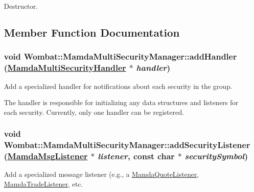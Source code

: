 Destructor. 



\subsection{Member Function Documentation}
\hypertarget{classWombat_1_1MamdaMultiSecurityManager_1a3afde9cf3c54cfc637a461346b3041}{
\subsubsection[addHandler]{\setlength{\rightskip}{0pt plus 5cm}void Wombat::Mamda\-Multi\-Security\-Manager::add\-Handler (\hyperlink{classWombat_1_1MamdaMultiSecurityHandler}{Mamda\-Multi\-Security\-Handler} $\ast$ {\em handler})}}
\label{classWombat_1_1MamdaMultiSecurityManager_1a3afde9cf3c54cfc637a461346b3041}


Add a specialized handler for notifications about each security in the group. 

The handler is responsible for initializing any data structures and listeners for each security. Currently, only one handler can be registered. \hypertarget{classWombat_1_1MamdaMultiSecurityManager_91699087725a9bfeadd57f3e958c3439}{
\subsubsection[addSecurityListener]{\setlength{\rightskip}{0pt plus 5cm}void Wombat::Mamda\-Multi\-Security\-Manager::add\-Security\-Listener (\hyperlink{classWombat_1_1MamdaMsgListener}{Mamda\-Msg\-Listener} $\ast$ {\em listener}, const char $\ast$ {\em security\-Symbol})}}
\label{classWombat_1_1MamdaMultiSecurityManager_91699087725a9bfeadd57f3e958c3439}


Add a specialized message listener (e.g., a \hyperlink{classWombat_1_1MamdaQuoteListener}{Mamda\-Quote\-Listener}, \hyperlink{classWombat_1_1MamdaTradeListener}{Mamda\-Trade\-Listener}, etc. 

